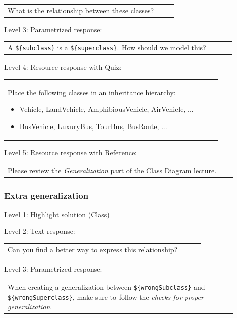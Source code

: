 \begin{tabular}{|p{0.9\linewidth}}
What is the relationship between these classes?
\end{tabular} \medskip

\noindent Level 3: Parametrized response: \medskip

\begin{tabular}{|p{0.9\linewidth}}
A \verb|${subclass}| is a \verb|${superclass}|. How should we model this?
\end{tabular} \medskip

\noindent Level 4: Resource response with Quiz: \medskip

\begin{tabular}{|p{0.9\linewidth}}
Place the following classes in an inheritance hierarchy:

\begin{itemize}
    \item Vehicle, LandVehicle, AmphibiousVehicle, AirVehicle, ...
    \item BusVehicle, LuxuryBus, TourBus, BusRoute, ...
\end{itemize}

\end{tabular} \medskip

\noindent Level 5: Resource response with Reference: \medskip

\begin{tabular}{|p{0.9\linewidth}}
Please review the \textit{Generalization} part of the Class Diagram lecture.
\end{tabular} \medskip


\subsubsection{Extra generalization}

\noindent Level 1: Highlight solution (Class) \medskip

\noindent Level 2: Text response: \medskip

\begin{tabular}{|p{0.9\linewidth}}
Can you find a better way to express this relationship?
\end{tabular} \medskip

\noindent Level 3: Parametrized response: \medskip

\begin{tabular}{|p{0.9\linewidth}}
When creating a generalization between \verb|${wrongSubclass}| and \verb|${wrongSuperclass}|, make sure to follow the \textit{checks for proper generalization}.
\end{tabular} \medskip

